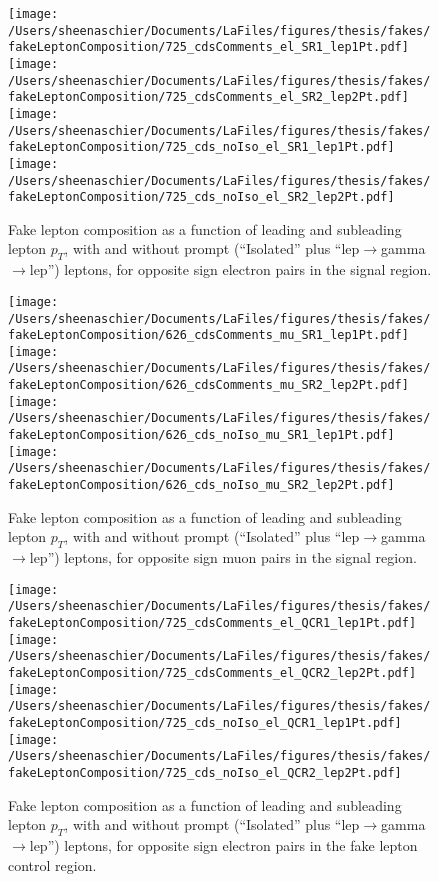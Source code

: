 \documentclass[11pt, oneside]{article}   	%
\begin{document}
\begin{figure}[htb]
        \centering
        \texttt{[image: /Users/sheenaschier/Documents/LaFiles/figures/thesis/fakes/fakeLeptonComposition/725\_cdsComments\_el\_SR1\_lep1Pt.pdf]}
        \texttt{[image: /Users/sheenaschier/Documents/LaFiles/figures/thesis/fakes/fakeLeptonComposition/725\_cdsComments\_el\_SR2\_lep2Pt.pdf]}
        \texttt{[image: /Users/sheenaschier/Documents/LaFiles/figures/thesis/fakes/fakeLeptonComposition/725\_cds\_noIso\_el\_SR1\_lep1Pt.pdf]}
        \texttt{[image: /Users/sheenaschier/Documents/LaFiles/figures/thesis/fakes/fakeLeptonComposition/725\_cds\_noIso\_el\_SR2\_lep2Pt.pdf]}
        \caption{Fake lepton composition as a function of leading and subleading lepton $p_{T}$, with and without prompt (``Isolated'' plus ``lep$\to$gamma$\to$lep'') leptons, for opposite sign electron pairs in the signal region.}
        \label{fig:elSR}
\end{figure}
\begin{figure}[htb]
        \centering
        \texttt{[image: /Users/sheenaschier/Documents/LaFiles/figures/thesis/fakes/fakeLeptonComposition/626\_cdsComments\_mu\_SR1\_lep1Pt.pdf]}
        \texttt{[image: /Users/sheenaschier/Documents/LaFiles/figures/thesis/fakes/fakeLeptonComposition/626\_cdsComments\_mu\_SR2\_lep2Pt.pdf]}
        \texttt{[image: /Users/sheenaschier/Documents/LaFiles/figures/thesis/fakes/fakeLeptonComposition/626\_cds\_noIso\_mu\_SR1\_lep1Pt.pdf]}
        \texttt{[image: /Users/sheenaschier/Documents/LaFiles/figures/thesis/fakes/fakeLeptonComposition/626\_cds\_noIso\_mu\_SR2\_lep2Pt.pdf]}
        \caption{Fake lepton composition as a function of leading and subleading lepton $p_{T}$, with and without prompt (``Isolated'' plus ``lep$\to$gamma$\to$lep'') leptons, for opposite sign muon pairs in the signal region.}
        \label{fig:muSR}
\end{figure}
\begin{figure}[htb]
        \centering
        \texttt{[image: /Users/sheenaschier/Documents/LaFiles/figures/thesis/fakes/fakeLeptonComposition/725\_cdsComments\_el\_QCR1\_lep1Pt.pdf]}
        \texttt{[image: /Users/sheenaschier/Documents/LaFiles/figures/thesis/fakes/fakeLeptonComposition/725\_cdsComments\_el\_QCR2\_lep2Pt.pdf]}
        \texttt{[image: /Users/sheenaschier/Documents/LaFiles/figures/thesis/fakes/fakeLeptonComposition/725\_cds\_noIso\_el\_QCR1\_lep1Pt.pdf]}
        \texttt{[image: /Users/sheenaschier/Documents/LaFiles/figures/thesis/fakes/fakeLeptonComposition/725\_cds\_noIso\_el\_QCR2\_lep2Pt.pdf]}
        \caption{Fake lepton composition as a function of leading and subleading lepton $p_{T}$, with and without prompt (``Isolated'' plus ``lep$\to$gamma$\to$lep'') leptons, for opposite sign electron pairs in the fake lepton control region.}
        \label{fig:elCR}
\end{figure}
\end{document}
